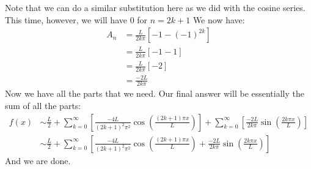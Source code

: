 \documentclass{article}
\begin{document}
\noindent Note that we can do a similar substitution here as we did with the cosine series. This time, however, we will have $0$ for $n = 2k+1$ We now have:
\begin{align*}
A_{n} &= \frac{L}{2k\pi}\left[-1-(-1)^{2k}\right]\\
&= \frac{L}{2k\pi}\left[-1 - 1\right]\\
&= \frac{L}{2k\pi}\left[-2\right]\\
&= \frac{-2L}{2k\pi}
\end{align*}
\noindent Now we have all the parts that we need. Our final answer will be essentially the sum of all the parts:
\begin{align*}
f(x)&\sim \frac{L}{2} + \sum_{k = 0}^{\infty}\left[\frac{-4L}{(2k+1)^{2}\pi^{2}}\cos{\left(\frac{(2k + 1)\pi x}{L}\right)} \right] + \sum_{k = 0}^{\infty}\left[\frac{-2L}{2k\pi}\sin{\left(\frac{2k\pi x}{L}\right)} \right]\\
&\sim \frac{L}{2} + \sum_{k = 0}^{\infty}\left[\frac{-4L}{(2k+1)^{2}\pi^{2}}\cos{\left(\frac{(2k + 1)\pi x}{L}\right)} + \frac{-2L}{2k\pi}\sin{\left(\frac{2k\pi x}{L}\right)} \right]
\end{align*}
\noindent And we are done.\\
\end{document}
